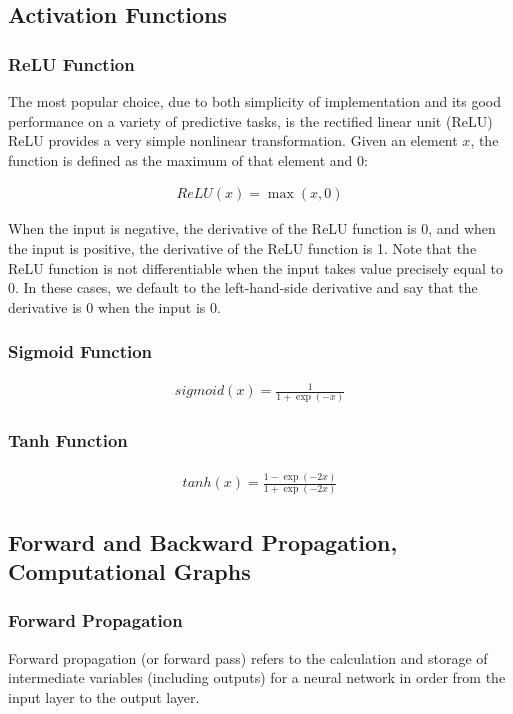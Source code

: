 \documentclass[a4paper,12pt]{article}
\theoremstyle{definition}
\begin{document}
\subsection*{Activation Functions}
\subsubsection*{ReLU Function}
The most popular choice, due to both simplicity of implementation and its good performance on a variety of predictive tasks, is the rectified linear unit (ReLU)
ReLU provides a very simple nonlinear transformation. Given an element $x$, the function is defined as the maximum of that element and 0:

\begin{align*}
    ReLU(x) = \max(x,0)
\end{align*}

When the input is negative, the derivative of the ReLU function is 0, and when the input is positive, the derivative of the ReLU function is 1. Note that the ReLU
function is not differentiable when the input takes value precisely equal to 0. In these cases, we default to the left-hand-side derivative and say that the derivative
is 0 when the input is 0.
\subsubsection*{Sigmoid Function}

\begin{align*}
    sigmoid(x) = \frac{1}{1+\exp(-x)}
\end{align*}

\subsubsection*{Tanh Function}

\begin{align*}
    tanh(x) = \frac{1-\exp(-2x)}{1+\exp(-2x)}
\end{align*}


\subsection*{Forward and Backward Propagation, Computational Graphs}
\subsubsection*{Forward Propagation}
Forward propagation (or forward pass) refers to the calculation and storage of intermediate variables (including outputs) for a neural network in order from
the input layer to the output layer.
\end{document}

